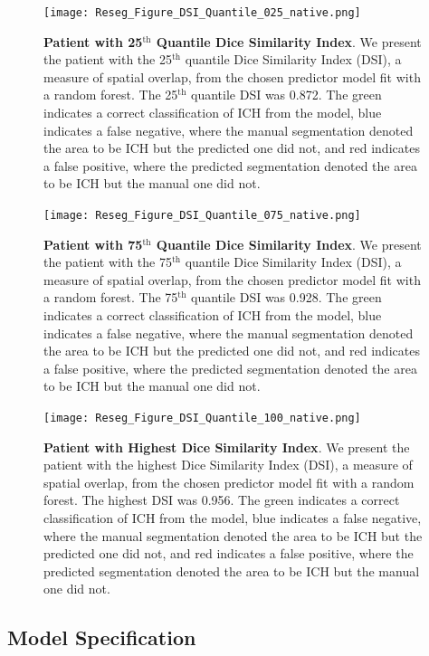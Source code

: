  \begin{figure}
\centering
\texttt{[image: Reseg\_Figure\_DSI\_Quantile\_025\_native.png]}
\caption{{\bf Patient with  25$^{\text{th}}$ Quantile Dice Similarity Index}. We present the patient with the 25$^{\text{th}}$ quantile Dice Similarity Index (DSI), a measure of spatial overlap, from the chosen predictor model fit with a random forest.  The 25$^{\text{th}}$ quantile DSI was 0.872. The green indicates a correct classification of ICH from the model, blue indicates a false negative, where the manual segmentation denoted the area to be ICH but the predicted one did not, and red indicates a false positive, where the predicted segmentation denoted the area to be ICH but the manual one did not. }
\label{fig:dice_img25}
\end{figure}

 \begin{figure}
\centering
\texttt{[image: Reseg\_Figure\_DSI\_Quantile\_075\_native.png]}
\caption{{\bf Patient with  75$^{\text{th}}$ Quantile Dice Similarity Index}. We present the patient with the 75$^{\text{th}}$ quantile Dice Similarity Index (DSI), a measure of spatial overlap, from the chosen predictor model fit with a random forest.  The 75$^{\text{th}}$ quantile DSI was 0.928. The green indicates a correct classification of ICH from the model, blue indicates a false negative, where the manual segmentation denoted the area to be ICH but the predicted one did not, and red indicates a false positive, where the predicted segmentation denoted the area to be ICH but the manual one did not. }
\label{fig:dice_img75}
\end{figure}

 \begin{figure}
\centering
\texttt{[image: Reseg\_Figure\_DSI\_Quantile\_100\_native.png]}
\caption{{\bf Patient with  Highest Dice Similarity Index}. We present the patient with the highest Dice Similarity Index (DSI), a measure of spatial overlap, from the chosen predictor model fit with a random forest.  The highest DSI was 0.956. The green indicates a correct classification of ICH from the model, blue indicates a false negative, where the manual segmentation denoted the area to be ICH but the predicted one did not, and red indicates a false positive, where the predicted segmentation denoted the area to be ICH but the manual one did not. }
\label{fig:dice_img100}
\end{figure}




\subsection{Model Specification}
\label{sec:modspec}

